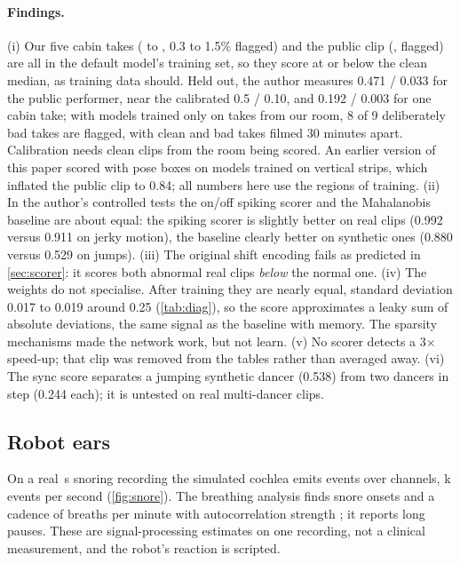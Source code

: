 \documentclass[10pt]{article}
\begin{document}
\paragraph{Findings.} (i) Our five cabin takes (\TakeEScore{} to \TakeAScore{}, 0.3 to 1.5\% flagged) and the public clip (\SoloScore{}, \SoloAbove{} flagged) are all in the default model's training set, so they score at or below the clean median, as training data should. Held out, the author measures 0.471 / 0.033 for the public performer, near the calibrated 0.5 / 0.10, and 0.192 / 0.003 for one cabin take; with models trained only on takes from our room, 8 of 9 deliberately bad takes are flagged, with clean and bad takes filmed 30 minutes apart. Calibration needs clean clips from the room being scored. An earlier version of this paper scored with pose boxes on models trained on vertical strips, which inflated the public clip to 0.84; all numbers here use the regions of training. (ii) In the author's controlled tests the on/off spiking scorer and the Mahalanobis baseline are about equal: the spiking scorer is slightly better on real clips (0.992 versus 0.911 on jerky motion), the baseline clearly better on synthetic ones (0.880 versus 0.529 on jumps). (iii) The original shift encoding fails as predicted in \cref{sec:scorer}: it scores both abnormal real clips \emph{below} the normal one. (iv) The weights do not specialise. After training they are nearly equal, standard deviation 0.017 to 0.019 around 0.25 (\cref{tab:diag}), so the score approximates a leaky sum of absolute deviations, the same signal as the baseline with memory. The sparsity mechanisms made the network work, but not learn. (v) No scorer detects a 3$\times$ speed-up; that clip was removed from the tables rather than averaged away. (vi) The sync score separates a jumping synthetic dancer (0.538) from two dancers in step (0.244 each); it is untested on real multi-dancer clips.

\subsection{Robot ears}
\label{sec:exp-ears}

On a real \SnoreSeconds\,s snoring recording the simulated cochlea emits \SnoreEvCount{} events over \SnoreChannels{} channels, \SnoreEvRate{}k events per second (\cref{fig:snore}). The breathing analysis finds \SnoreOnsets{} snore onsets and a cadence of \SnoreBpm{} breaths per minute with autocorrelation strength \SnoreCadence; it reports \SnorePauses{} long pauses. These are signal-processing estimates on one recording, not a clinical measurement, and the robot's reaction is scripted.
\end{document}
